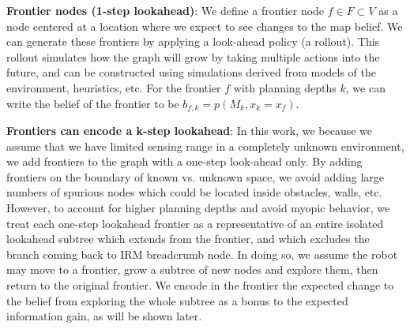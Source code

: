 \documentclass[letterpaper, 10 pt, conference]{ieeeconf}  %
\newcommand{\ph}[1]{{\textbf{#1}:}} %
\begin{document}
\ph{Frontier nodes (1-step lookahead)}
We define a frontier node $f\in F\subset V$ as a node centered at a location where we expect to see changes to the map belief.  We can generate these frontiers by applying a look-ahead policy (a rollout).  This rollout simulates how the graph will grow by taking multiple actions into the future, and can be constructed using simulations derived from models of the environment, heuristics, etc.  For the frontier $f$ with planning depths $k$, we can write the belief of the frontier to be $b_{f,k} = p(M_k, x_k = x_f)$.

\ph{Frontiers can encode a k-step lookahead}
In this work, we because we assume that we have limited sensing range in a completely unknown environment, we add frontiers to the graph with a one-step look-ahead only.  By adding frontiers on the boundary of known vs. unknown space, we avoid adding large numbers of spurious nodes which could be located inside obstacles, walls, etc.  However, to account for higher planning depths and avoid myopic behavior, we treat each one-step lookahead frontier as a representative of an entire isolated lookahead  subtree which extends from the frontier, and which excludes the branch coming back to IRM breadcrumb node.  In doing so, we assume the robot may move to a frontier, grow a subtree of new nodes and explore them, then return to the original frontier.  We encode in the frontier the expected change to the belief from exploring the whole subtree as a bonus to the expected information gain, as will be shown later.
\end{document}
